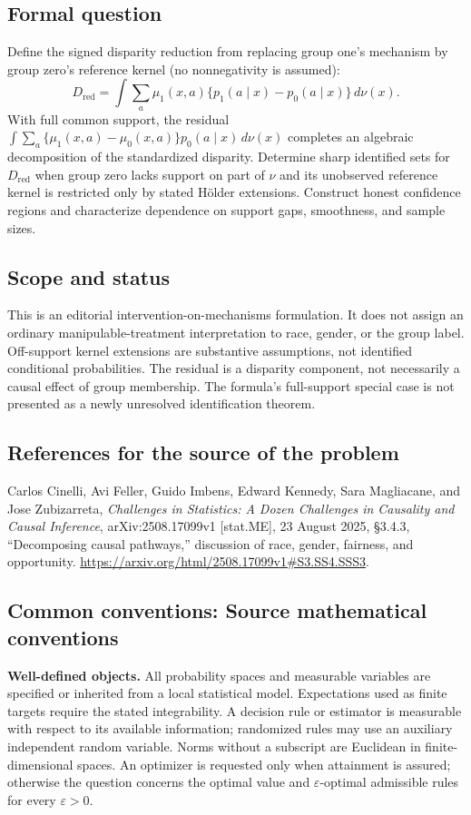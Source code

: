 \documentclass[11pt,a4paper]{article}
\begin{document}
\subsection*{Formal question}
Define the signed disparity reduction from replacing group one's mechanism by group zero's reference kernel (no nonnegativity is assumed):
\[
 D_{\mathrm{red}}=\int\sum_a\mu_1(x,a)\{p_1(a\mid x)-p_0(a\mid x)\}\,d\nu(x).
\]
With full common support, the residual $\int\sum_a\{\mu_1(x,a)-\mu_0(x,a)\}p_0(a\mid x)\,d\nu(x)$ completes an algebraic decomposition of the standardized disparity. Determine sharp identified sets for $D_{\mathrm{red}}$ when group zero lacks support on part of $\nu$ and its unobserved reference kernel is restricted only by stated H\"older extensions. Construct honest confidence regions and characterize dependence on support gaps, smoothness, and sample sizes.
\subsection*{Scope and status}
This is an editorial intervention-on-mechanisms formulation. It does not assign an ordinary manipulable-treatment interpretation to race, gender, or the group label. Off-support kernel extensions are substantive assumptions, not identified conditional probabilities. The residual is a disparity component, not necessarily a causal effect of group membership. The formula's full-support special case is not presented as a newly unresolved identification theorem.
\subsection*{References for the source of the problem}
Carlos Cinelli, Avi Feller, Guido Imbens, Edward Kennedy, Sara Magliacane, and Jose Zubizarreta, \emph{Challenges in Statistics: A Dozen Challenges in Causality and Causal Inference}, arXiv:2508.17099v1 [stat.ME], 23 August 2025, \S3.4.3, ``Decomposing causal pathways,'' discussion of race, gender, fairness, and opportunity. \url{https://arxiv.org/html/2508.17099v1#S3.SS4.SSS3}.

\subsection*{Common conventions: Source mathematical conventions}

\textbf{Well-defined objects.}
All probability spaces and measurable variables are specified or inherited
from a local statistical model. Expectations used as finite targets require
the stated integrability. A decision rule or estimator is measurable with
respect to its available information; randomized rules may use an auxiliary
independent random variable. Norms without a subscript are Euclidean in
finite-dimensional spaces. An optimizer is requested only when attainment
is assured; otherwise the question concerns the optimal value and
$\varepsilon$-optimal admissible rules for every $\varepsilon>0$.
\end{document}
